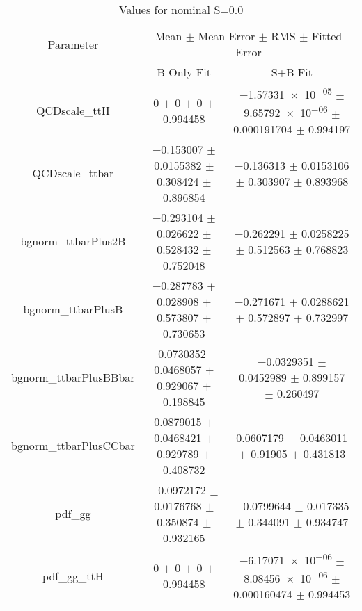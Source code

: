 \begin{table}
\centering
\caption{Values for nominal S=0.0}
\begin{tabular}{ccc}
\toprule
Parameter & \multicolumn{2}{c}{Mean $\pm$ Mean Error $\pm$ RMS $\pm$ Fitted Error}\\
 & B-Only Fit & S+B Fit\\
\midrule
QCDscale\_ttH & \num{0} $\pm$ \num{0} $\pm$ \num{0} $\pm$ \num{0.994458} & \num{-1.57331e-05} $\pm$ \num{9.65792e-06} $\pm$ \num{0.000191704} $\pm$ \num{0.994197}\\
QCDscale\_ttbar & \num{-0.153007} $\pm$ \num{0.0155382} $\pm$ \num{0.308424} $\pm$ \num{0.896854} & \num{-0.136313} $\pm$ \num{0.0153106} $\pm$ \num{0.303907} $\pm$ \num{0.893968}\\
bgnorm\_ttbarPlus2B & \num{-0.293104} $\pm$ \num{0.026622} $\pm$ \num{0.528432} $\pm$ \num{0.752048} & \num{-0.262291} $\pm$ \num{0.0258225} $\pm$ \num{0.512563} $\pm$ \num{0.768823}\\
bgnorm\_ttbarPlusB & \num{-0.287783} $\pm$ \num{0.028908} $\pm$ \num{0.573807} $\pm$ \num{0.730653} & \num{-0.271671} $\pm$ \num{0.0288621} $\pm$ \num{0.572897} $\pm$ \num{0.732997}\\
bgnorm\_ttbarPlusBBbar & \num{-0.0730352} $\pm$ \num{0.0468057} $\pm$ \num{0.929067} $\pm$ \num{0.198845} & \num{-0.0329351} $\pm$ \num{0.0452989} $\pm$ \num{0.899157} $\pm$ \num{0.260497}\\
bgnorm\_ttbarPlusCCbar & \num{0.0879015} $\pm$ \num{0.0468421} $\pm$ \num{0.929789} $\pm$ \num{0.408732} & \num{0.0607179} $\pm$ \num{0.0463011} $\pm$ \num{0.91905} $\pm$ \num{0.431813}\\
pdf\_gg & \num{-0.0972172} $\pm$ \num{0.0176768} $\pm$ \num{0.350874} $\pm$ \num{0.932165} & \num{-0.0799644} $\pm$ \num{0.017335} $\pm$ \num{0.344091} $\pm$ \num{0.934747}\\
pdf\_gg\_ttH & \num{0} $\pm$ \num{0} $\pm$ \num{0} $\pm$ \num{0.994458} & \num{-6.17071e-06} $\pm$ \num{8.08456e-06} $\pm$ \num{0.000160474} $\pm$ \num{0.994453}\\
\bottomrule
\end{tabular}
\end{table}